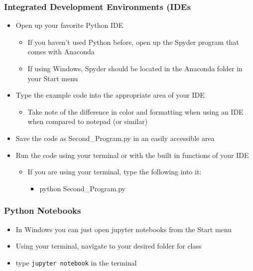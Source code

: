 \documentclass[mini frame in current subsection]{beamer}
\begin{document}
	
		\begin{frame}
			\frametitle{Integrated Development Environments (IDEs}
			\begin{itemize}
				\vfill \item  Open up your favorite Python IDE
					\begin{itemize}
						\item  If you haven't used Python before, open up the Spyder program that comes with Anaconda
						\item  If using Windows, Spyder should be located in the Anaconda folder in your Start menu
					\end{itemize}
				\vfill \item  Type the example code into the appropriate area of your IDE
					\begin{itemize}
						\item  Take note of the difference in color and formatting when using an IDE when compared to notepad (or similar)
					\end{itemize}
				\vfill \item  Save the code as Second\_Program.py in an easily accessible area
				\vfill \item  Run the code using your terminal or with the built in functions of your IDE
					\begin{itemize}
						\item  If you are using your terminal, type the following into it:
							\begin{itemize}
								\item  python Second\_Program.py
							\end{itemize}
					\end{itemize}
			\end{itemize}
		\end{frame}
		
	
		\begin{frame}
			\frametitle{Python Notebooks}
			\begin{itemize}
				\vfill \item  In Windows you can just open jupyter notebooks from the Start menu
				\vfill \item  Using your terminal, navigate to your desired folder for class
				\vfill \item  type \texttt{jupyter notebook} in the terminal
			\end{itemize}
		\end{frame}
	
\end{document}
